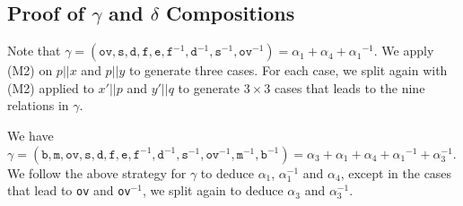 \documentclass{llncs}
\begin{document}
\subsection{Proof of $\gamma$ and $\delta$ Compositions}
\label{sect:gammadelta}


Note that $\gamma = (\texttt{ov}, \texttt{s}, \texttt{d}, \texttt{f}, \texttt{e}, \texttt{f}^{-1}, \texttt{d}^{-1}, \texttt{s}^{-1}, \texttt{ov}^{-1}) = \alpha_1 +  \alpha_4  + {\alpha_1}^{-1}$. We apply (M2) on $p||x$ and $p||y$ to generate three cases. For each case, we split again with (M2) applied to $x'||p$ and $y'||q$ to generate $3\times3$  cases that leads to  the nine relations in $\gamma$. %

We have $\gamma = (\texttt{b}, \texttt{m}, \texttt{ov}, \texttt{s}, \texttt{d}, \texttt{f}, \texttt{e}, \texttt{f}^{-1}, \texttt{d}^{-1}, \texttt{s}^{-1}, \texttt{ov}^{-1}, \texttt{m}^{-1}, \texttt{b}^{-1}) = \alpha_3 +  \alpha_1 + \alpha_4  + {\alpha_1}^{-1} + \alpha_3^{-1}$. We follow the above strategy for $\gamma$ to deduce $\alpha_1$, $\alpha_1^{-1}$ and $\alpha_4$, except in the cases that lead to \texttt{ov} and \texttt{ov}$^{-1}$, we split again to deduce $\alpha_3$ and $\alpha_3^{-1}$. %
%
%
\end{document}
